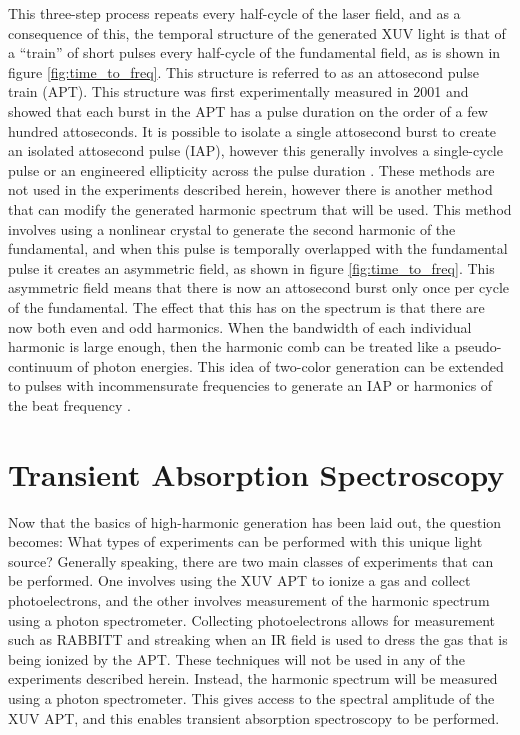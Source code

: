 This three-step process repeats every half-cycle of the laser field, and as a consequence of this, the temporal structure of the generated XUV light is that of a ``train'' of short pulses every half-cycle of the fundamental field, as is shown in figure \ref{fig:time_to_freq}.  This structure is referred to as an attosecond pulse train (APT).  This structure was first experimentally measured in 2001 \cite{paulObservationTrainAttosecond2001} and showed that each burst in the APT has a pulse duration on the order of a few hundred attoseconds.  It is possible to isolate a single attosecond burst to create an isolated attosecond pulse (IAP), however this generally involves a single-cycle pulse \cite{hentschelAttosecondMetrology2001} or an engineered ellipticity across the pulse duration \cite{mashikoDoubleOpticalGating2008}.  These methods are not used in the experiments described herein, however there is another method that can modify the generated harmonic spectrum that will be used.  This method involves using a nonlinear crystal to generate the second harmonic of the fundamental, and when this pulse is temporally overlapped with the fundamental pulse it creates an asymmetric field, as shown in figure \ref{fig:time_to_freq}.  This asymmetric field means that there is now an attosecond burst only once per cycle of the fundamental.  The effect that this has on the spectrum is that there are now both even and odd harmonics.  When the bandwidth of each individual harmonic is large enough, then the harmonic comb can be treated like a pseudo-continuum of photon energies.  This idea of two-color generation can be extended to pulses with incommensurate frequencies to generate an IAP or harmonics of the beat frequency \cite{takahashiInfraredTwoColorMulticycle2010, haesslerEnhancedMulticolourGating2015}.



\section{Transient Absorption Spectroscopy}
\label{sec:intro_transient_absorption}

Now that the basics of high-harmonic generation has been laid out, the question becomes: What types of experiments can be performed with this unique light source?  Generally speaking, there are two main classes of experiments that can be performed.  One involves using the XUV APT to ionize a gas and collect photoelectrons, and the other involves measurement of the harmonic spectrum using a photon spectrometer.  Collecting photoelectrons allows for measurement such as RABBITT \cite{paulObservationTrainAttosecond2001} and streaking \cite{hentschelAttosecondMetrology2001} when an IR field is used to dress the gas that is being ionized  by the APT.  These techniques will not be used in any of the experiments described herein.  Instead, the harmonic spectrum will be measured using a photon spectrometer.  This gives access to the spectral amplitude of the XUV APT, and this enables transient absorption spectroscopy to be performed.

